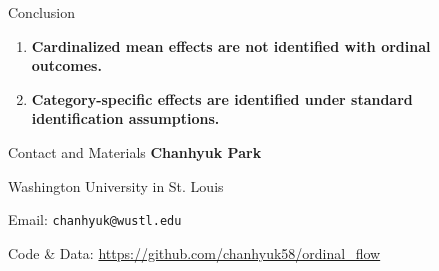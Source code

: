 \documentclass[final]{beamer}
\newlength{\sepwidth}
\newlength{\colwidth}
\newcommand{\separatorcolumn}{\begin{column}{\sepwidth}\end{column}}
\begin{document}
\begin{frame}[t]
\begin{columns}[t,totalwidth=0.995\paperwidth]
\begin{column}{\colwidth}
\begin{block}{Conclusion}
\begin{enumerate}\setlength\itemsep{0.35em}
  \item \textbf{Cardinalized mean effects are not identified with ordinal outcomes.}
  \item \textbf{Category-specific effects are identified under standard identification assumptions.}
\end{enumerate}
\end{block}

\begin{block}{Contact and Materials}
\textbf{Chanhyuk Park}\par
Washington University in St. Louis\par
Email: \texttt{chanhyuk@wustl.edu}\par
\vspace{0.2em}
Code \& Data: \url{https://github.com/chanhyuk58/ordinal_flow}
\end{block}

\end{column}
\separatorcolumn
\end{columns}
\end{frame}
\end{document}
